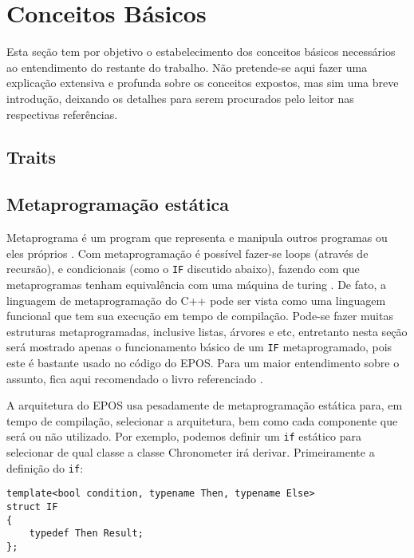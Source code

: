 \chapter{Conceitos Básicos}

Esta seção tem por objetivo o estabelecimento dos conceitos básicos necessários ao entendimento do restante do trabalho. Não pretende-se aqui fazer uma explicação extensiva e profunda sobre os conceitos expostos, mas sim uma breve introdução, deixando os detalhes para serem procurados pelo leitor nas respectivas referências.

\section{Traits}


\section{Metaprogramação estática}
Metaprograma é um program que representa e manipula outros programas ou eles próprios \cite{generative}.
Com metaprogramação é possível fazer-se loops (através de recursão), e condicionais (como o \verb+IF+ discutido abaixo), fazendo com que metaprogramas tenham equivalência com uma máquina de turing \cite{generative}. De fato, a linguagem de metaprogramação do C++ pode ser vista como uma linguagem funcional que tem sua execução em tempo de compilação. Pode-se fazer muitas estruturas metaprogramadas, inclusive listas, árvores e etc, entretanto nesta seção será mostrado apenas o funcionamento básico de um \verb+IF+ metaprogramado, pois este é bastante usado no código do EPOS. Para um maior entendimento sobre o assunto, fica aqui recomendado o livro referenciado \cite{generative}.

A arquitetura do EPOS usa pesadamente de metaprogramação estática para, em tempo de compilação, selecionar a arquitetura, bem como cada componente que será ou não utilizado. Por exemplo, podemos definir um \verb+if+ estático para selecionar de qual classe a classe Chronometer irá derivar. Primeiramente a definição do \verb+if+:

\begin{verbatim}
template<bool condition, typename Then, typename Else>
struct IF
{
    typedef Then Result;
};
\end{verbatim}

